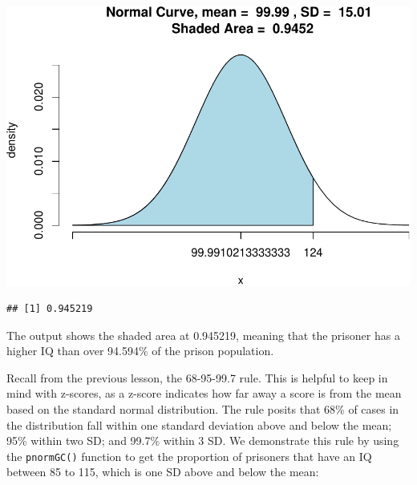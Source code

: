 \documentclass[
]{book}
\newenvironment{Shaded}{\begin{snugshade}}{\end{snugshade}}
\newcommand{\AttributeTok}[1]{\textcolor[rgb]{0.77,0.63,0.00}{#1}}
\newcommand{\CommentTok}[1]{\textcolor[rgb]{0.56,0.35,0.01}{\textit{#1}}}
\newcommand{\ConstantTok}[1]{\textcolor[rgb]{0.00,0.00,0.00}{#1}}
\newcommand{\DecValTok}[1]{\textcolor[rgb]{0.00,0.00,0.81}{#1}}
\newcommand{\FunctionTok}[1]{\textcolor[rgb]{0.00,0.00,0.00}{#1}}
\newcommand{\NormalTok}[1]{#1}
\newcommand{\OtherTok}[1]{\textcolor[rgb]{0.56,0.35,0.01}{#1}}
\newcommand{\SpecialCharTok}[1]{\textcolor[rgb]{0.00,0.00,0.00}{#1}}
\newcommand{\StringTok}[1]{\textcolor[rgb]{0.31,0.60,0.02}{#1}}
\begin{document}
\begin{Shaded}
\end{Shaded}

\includegraphics{06-hypotheses_files/figure-latex/unnamed-chunk-24-1.pdf}

\begin{verbatim}
## [1] 0.945219
\end{verbatim}

The output shows the shaded area at 0.945219, meaning that the prisoner has a higher IQ than over 94.594\% of the prison population.

Recall from the previous lesson, the 68-95-99.7 rule. This is helpful to keep in mind with z-scores, as a z-score indicates how far away a score is from the mean based on the standard normal distribution. The rule posits that 68\% of cases in the distribution fall within one standard deviation above and below the mean; 95\% within two SD; and 99.7\% within 3 SD. We demonstrate this rule by using the \texttt{pnormGC()} function to get the proportion of prisoners that have an IQ between 85 to 115, which is one SD above and below the mean:
\end{document}

